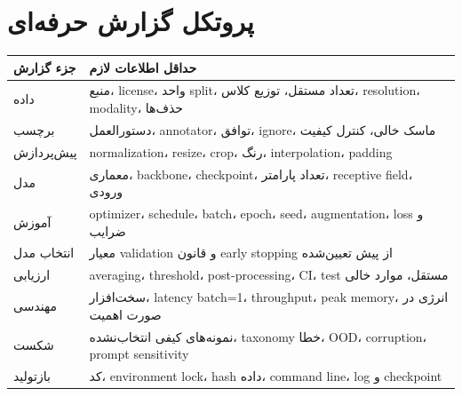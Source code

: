 \documentclass[12pt,openany,oneside]{book}
\begin{document}
\section{پروتکل گزارش حرفه‌ای}
\begin{longtable}{p{37mm}p{102mm}}
\toprule
جزء گزارش & حداقل اطلاعات لازم \\
\midrule
داده & منبع، license، واحد split، تعداد مستقل، توزیع کلاس، resolution، modality، حذف‌ها \\
برچسب & دستورالعمل، annotator، توافق، ignore، ماسک خالی، کنترل کیفیت \\
پیش‌پردازش & normalization، resize، crop، رنگ، interpolation، padding \\
مدل & معماری، backbone، checkpoint، تعداد پارامتر، receptive field، ورودی \\
آموزش & optimizer، schedule، batch، epoch، seed، augmentation، loss و ضرایب \\
انتخاب مدل & معیار validation و قانون early stopping از پیش تعیین‌شده \\
ارزیابی & averaging، threshold، post-processing، CI، test مستقل، موارد خالی \\
مهندسی & سخت‌افزار، latency batch=1، throughput، peak memory، انرژی در صورت اهمیت \\
شکست & نمونه‌های کیفی انتخاب‌نشده، taxonomy خطا، OOD، corruption، prompt sensitivity \\
بازتولید & کد، environment lock، hash داده، command line، log و checkpoint \\
\bottomrule
\end{longtable}
\end{document}
